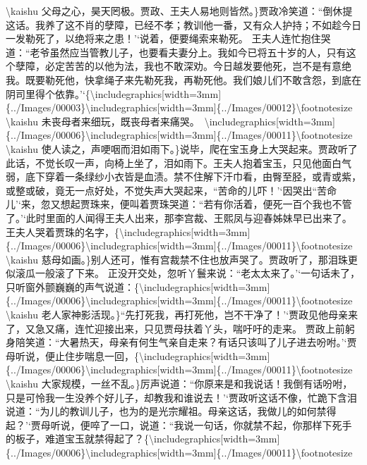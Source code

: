 \textbackslash{}kaishu
父母之心，昊天罔极。贾政、王夫人易地则皆然。\}贾政冷笑道：``倒休提这话。我养了这不肖的孽障，已经不孝；教训他一番，又有众人护持；不如趁今日一发勒死了，以绝将来之患！'`说着，便要绳索来勒死。
王夫人连忙抱住哭道：``老爷虽然应当管教儿子，也要看夫妻分上。我如今已将五十岁的人，只有这个孽障，必定苦苦的以他为法，我也不敢深劝。今日越发要他死，岂不是有意绝我。既要勒死他，快拿绳子来先勒死我，再勒死他。我们娘儿们不敢含怨，到底在阴司里得个依靠。'`\{\textbackslash{}includegraphics{[}width=3mm{]}\{../Images/00003\}\textbackslash{}includegraphics{[}width=3mm{]}\{../Images/00012\}\textbackslash{}footnotesize
\textbackslash{}kaishu
未丧母者来细玩，既丧母者来痛哭。　\textbackslash{}includegraphics{[}width=3mm{]}\{../Images/00006\}\textbackslash{}includegraphics{[}width=3mm{]}\{../Images/00011\}\textbackslash{}footnotesize
\textbackslash{}kaishu
使人读之，声哽咽而泪如雨下。\}说毕，爬在宝玉身上大哭起来。贾政听了此话，不觉长叹一声，向椅上坐了，泪如雨下。王夫人抱着宝玉，只见他面白气弱，底下穿着一条绿纱小衣皆是血渍。禁不住解下汗巾看，由臀至胫，或青或紫，或整或破，竟无一点好处，不觉失声大哭起来，``苦命的儿吓！'`因哭出``苦命儿'`来，忽又想起贾珠来，便叫着贾珠哭道：``若有你活着，便死一百个我也不管了。'`此时里面的人闻得王夫人出来，那李宫裁、王熙凤与迎春姊妹早已出来了。王夫人哭着贾珠的名字，\{\textbackslash{}includegraphics{[}width=3mm{]}\{../Images/00006\}\textbackslash{}includegraphics{[}width=3mm{]}\{../Images/00011\}\textbackslash{}footnotesize
\textbackslash{}kaishu
慈母如画。\}别人还可，惟有宫裁禁不住也放声哭了。贾政听了，那泪珠更似滚瓜一般滚了下来。
正没开交处，忽听丫鬟来说：``老太太来了。'`一句话未了，只听窗外颤巍巍的声气说道：\{\textbackslash{}includegraphics{[}width=3mm{]}\{../Images/00006\}\textbackslash{}includegraphics{[}width=3mm{]}\{../Images/00011\}\textbackslash{}footnotesize
\textbackslash{}kaishu
老人家神影活现。\}``先打死我，再打死他，岂不干净了！'`贾政见他母亲来了，又急又痛，连忙迎接出来，只见贾母扶着丫头，喘吁吁的走来。
贾政上前躬身陪笑道：``大暑热天，母亲有何生气亲自走来？有话只该叫了儿子进去吩咐。'`贾母听说，便止住步喘息一回，\{\textbackslash{}includegraphics{[}width=3mm{]}\{../Images/00006\}\textbackslash{}includegraphics{[}width=3mm{]}\{../Images/00011\}\textbackslash{}footnotesize
\textbackslash{}kaishu
大家规模，一丝不乱。\}厉声说道：``你原来是和我说话！我倒有话吩咐，只是可怜我一生没养个好儿子，却教我和谁说去！'`贾政听这话不像，忙跪下含泪说道：``为儿的教训儿子，也为的是光宗耀祖。母亲这话，我做儿的如何禁得起？'`贾母听说，便啐了一口，说道：``我说一句话，你就禁不起，你那样下死手的板子，难道宝玉就禁得起了？\{\textbackslash{}includegraphics{[}width=3mm{]}\{../Images/00006\}\textbackslash{}includegraphics{[}width=3mm{]}\{../Images/00011\}\textbackslash{}footnotesize
